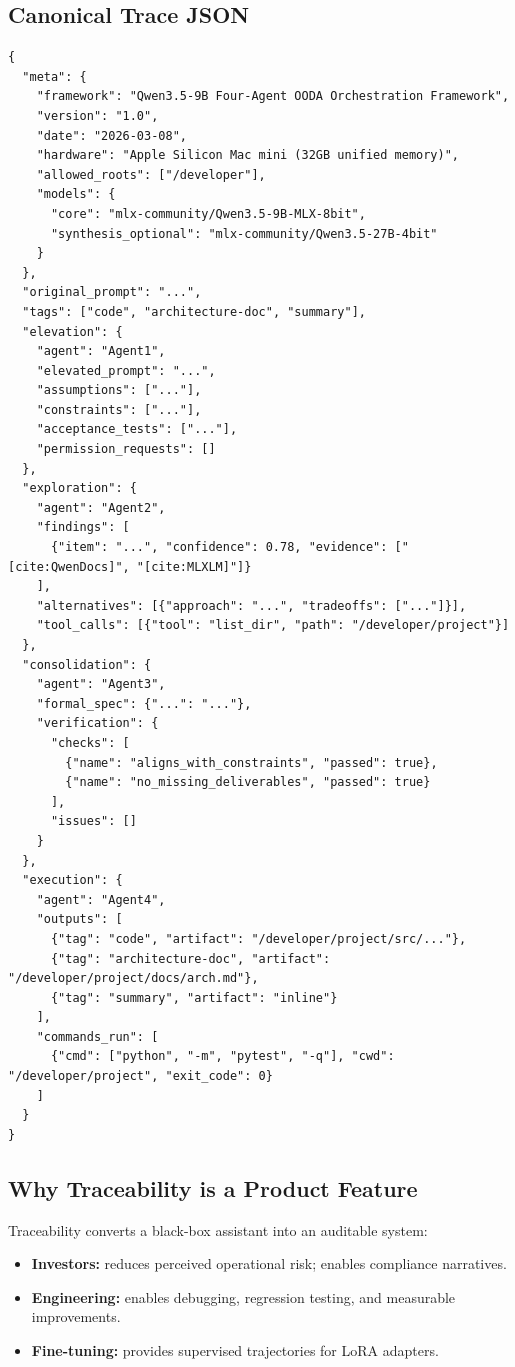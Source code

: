 \documentclass[11pt]{article}
\begin{document}
\subsection{Canonical Trace JSON}

\begin{lstlisting}[style=json, caption={Traceability JSON (example)}]
{
  "meta": {
    "framework": "Qwen3.5-9B Four-Agent OODA Orchestration Framework",
    "version": "1.0",
    "date": "2026-03-08",
    "hardware": "Apple Silicon Mac mini (32GB unified memory)",
    "allowed_roots": ["/developer"],
    "models": {
      "core": "mlx-community/Qwen3.5-9B-MLX-8bit",
      "synthesis_optional": "mlx-community/Qwen3.5-27B-4bit"
    }
  },
  "original_prompt": "...",
  "tags": ["code", "architecture-doc", "summary"],
  "elevation": {
    "agent": "Agent1",
    "elevated_prompt": "...",
    "assumptions": ["..."],
    "constraints": ["..."],
    "acceptance_tests": ["..."],
    "permission_requests": []
  },
  "exploration": {
    "agent": "Agent2",
    "findings": [
      {"item": "...", "confidence": 0.78, "evidence": ["[cite:QwenDocs]", "[cite:MLXLM]"]}
    ],
    "alternatives": [{"approach": "...", "tradeoffs": ["..."]}],
    "tool_calls": [{"tool": "list_dir", "path": "/developer/project"}]
  },
  "consolidation": {
    "agent": "Agent3",
    "formal_spec": {"...": "..."},
    "verification": {
      "checks": [
        {"name": "aligns_with_constraints", "passed": true},
        {"name": "no_missing_deliverables", "passed": true}
      ],
      "issues": []
    }
  },
  "execution": {
    "agent": "Agent4",
    "outputs": [
      {"tag": "code", "artifact": "/developer/project/src/..."},
      {"tag": "architecture-doc", "artifact": "/developer/project/docs/arch.md"},
      {"tag": "summary", "artifact": "inline"}
    ],
    "commands_run": [
      {"cmd": ["python", "-m", "pytest", "-q"], "cwd": "/developer/project", "exit_code": 0}
    ]
  }
}
\end{lstlisting}

\subsection{Why Traceability is a Product Feature}

Traceability converts a black-box assistant into an auditable system:
\begin{itemize}
  \item \textbf{Investors:} reduces perceived operational risk; enables compliance narratives.
  \item \textbf{Engineering:} enables debugging, regression testing, and measurable improvements.
  \item \textbf{Fine-tuning:} provides supervised trajectories for LoRA adapters.
\end{itemize}
\end{document}
